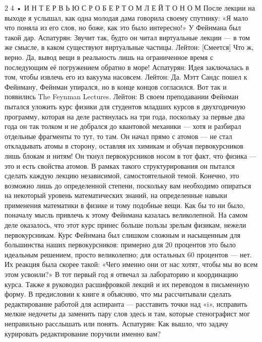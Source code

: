 \documentclass[11pt,oneside]{article}
\begin{document}
2 4 • И Н Т Е Р В Ь Ю  С  Р О Б Е Р Т О М  Л Е Й Т О Н О М После лекции на выходе я услышал, как одна молодая дама говорила своему спутнику: «Я мало что поняла из его слов, но боже, как это было интересно!» У Фейнмана был такой дар. Аспатурян: Звучит так, будто он читал виртуальные лекции --- в том же смысле, в каком существуют виртуальные частицы. Лейтон: [Смеется] Что ж, верно. Да, вывод вещи в реальность лишь на ограниченное время с последующим её погружением обратно в море! Аспатурян: Идея заключалась в том, чтобы извлечь его из вакуума насовсем. Лейтон: Да. Мэтт Сандс пошел к Фейнману, Фейнман упирался, но в конце концов согласился. Вот так и появились The Feynman Lectures. Лейтон: В своем преподавании Фейнман пытался уложить курс физики для студентов младших курсов в двухгодичную программу, которая на деле растянулась на три года, поскольку за первые два года он так толком и не добрался до квантовой механики --- хотя и разбирал отдельные фрагменты то тут, то там. Он начал прямо с атомов --- не стал откладывать атомы в сторону, оставляя их химикам и обучая первокурсников лишь блокам и нитям! Он ткнул первокурсников носом в тот факт, что физика --- это и есть свойства атомов. В рамках такого структурирования он пытался сделать каждую лекцию независимой, самостоятельной темой. Конечно, это возможно лишь до определенной степени, поскольку вам необходимо опираться на некоторый уровень математических знаний, на определенные навыки применения математики в физике и тому подобные вещи. Как бы то ни было, поначалу мысль привлечь к этому Фейнмана казалась великолепной. На самом деле оказалось, что этот курс принес больше пользы зрелым физикам, нежели первокурсникам. Курс Фейнмана был слишком сложным и насыщенным для большинства наших первокурсников: примерно для 20 процентов это было идеальным решением, просто великолепно; для остальных 60 процентов --- нет. Их реакция была скорее такой: «Чего именно они от нас хотят, чтобы мы во всем этом усвоили?» В тот первый год я отвечал за лабораторию и координацию курса. Также я руководил расшифровкой лекций и их переводом в письменную форму. В предисловии к книге я объясняю, что мы рассчитывали сделать редактирование работой для аспиранта --- расставить точки над «i», исправить мелкие недочеты да заменить пару слов здесь и там, которые стенографист мог неправильно расслышать или понять. Аспатурян: Как вышло, что задачу курировать редактирование поручили именно вам?\par
\end{document}
